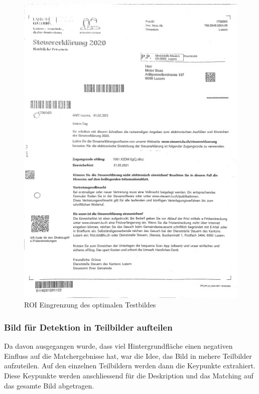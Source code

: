 \begin{figure}[H]
\begin{minipage}[t]{0.32\linewidth}
  \includegraphics[width=1.0\textwidth]{img/piktogrammerkennung/scanned_doc.jpg}
  \caption{ROI Eingrenzung des optimalen Testbildes}
  \label{fig:scanned-doc}
  \end{minipage}
\end{figure}

\subsubsection{Bild für Detektion in Teilbilder aufteilen}
\label{sec:detektion-auf-teilbildern}
Da davon ausgegangen wurde, dass viel Hintergrundfläche einen negativen Einfluss auf die Matchergebnisse hat, war die Idee, das Bild in mehere Teilbilder aufzuteilen. Auf den einzelnen Teilbildern werden dann die Keypunkte extrahiert. Diese Keypunkte werden anschliessend für die Deskription und das Matching auf das gesamte Bild abgetragen.

